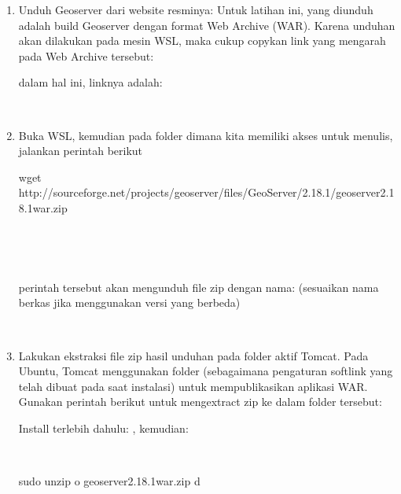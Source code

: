 \documentclass[letterpaper,10pt,english]{sphinxmanual}
\begin{document}
\begin{enumerate}
%
\item {} 
Unduh Geoserver dari website resminya: 
Untuk latihan ini, yang diunduh adalah build Geoserver dengan format Web Archive (WAR). Karena unduhan akan dilakukan pada mesin WSL, maka cukup copykan link yang mengarah pada Web Archive tersebut:


dalam hal ini, linknya adalah:


 

\item {} 
Buka WSL, kemudian pada folder dimana kita memiliki akses untuk menulis, jalankan perintah berikut

\begin{sphinxVerbatim}[commandchars=\\\{\}]
wget http://sourceforge.net/projects/geoserver/files/GeoServer/2.18.1/geoserver\PYGZhy{}2.18.1\PYGZhy{}war.zip
\end{sphinxVerbatim}

 


 

perintah tersebut akan mengunduh file zip dengan nama:  (sesuaikan nama berkas jika menggunakan versi yang berbeda)

 

\item {} 
Lakukan ekstraksi file zip hasil unduhan pada folder aktif Tomcat.
Pada Ubuntu, Tomcat menggunakan folder  (sebagaimana pengaturan softlink yang telah dibuat pada saat instalasi) untuk mempublikasikan aplikasi WAR. Gunakan perintah berikut untuk mengextract zip ke dalam folder tersebut:

Install  terlebih dahulu:
, kemudian:

 

\begin{sphinxVerbatim}[commandchars=\\\{\}]
 sudo unzip \PYGZhy{}o geoserver\PYGZhy{}2.18.1\PYGZhy{}war.zip \PYGZhy{}d 
\end{sphinxVerbatim}


\end{enumerate}
\end{document}
